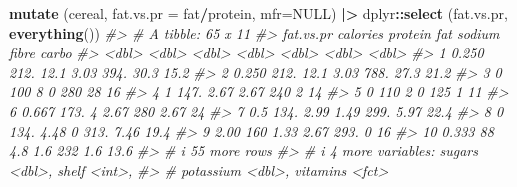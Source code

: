 \documentclass[
]{book}
\newenvironment{Shaded}{\begin{snugshade}}{\end{snugshade}}
\newcommand{\AttributeTok}[1]{\textcolor[rgb]{0.13,0.29,0.53}{#1}}
\newcommand{\CommentTok}[1]{\textcolor[rgb]{0.56,0.35,0.01}{\textit{#1}}}
\newcommand{\ConstantTok}[1]{\textcolor[rgb]{0.56,0.35,0.01}{#1}}
\newcommand{\FunctionTok}[1]{\textcolor[rgb]{0.13,0.29,0.53}{\textbf{#1}}}
\newcommand{\NormalTok}[1]{#1}
\newcommand{\SpecialCharTok}[1]{\textcolor[rgb]{0.81,0.36,0.00}{\textbf{#1}}}
\begin{document}
\begin{Shaded}
\begin{Highlighting}[]
\FunctionTok{mutate}\NormalTok{ (cereal, }\AttributeTok{fat.vs.pr =}\NormalTok{ fat}\SpecialCharTok{/}\NormalTok{protein, }\AttributeTok{mfr=}\ConstantTok{NULL}\NormalTok{) }\SpecialCharTok{|\textgreater{}}
\NormalTok{     dplyr}\SpecialCharTok{::}\FunctionTok{select}\NormalTok{ (fat.vs.pr, }\FunctionTok{everything}\NormalTok{())}
\CommentTok{\#\textgreater{} \# A tibble: 65 x 11}
\CommentTok{\#\textgreater{}    fat.vs.pr calories protein   fat sodium fibre carbo}
\CommentTok{\#\textgreater{}        \textless{}dbl\textgreater{}    \textless{}dbl\textgreater{}   \textless{}dbl\textgreater{} \textless{}dbl\textgreater{}  \textless{}dbl\textgreater{} \textless{}dbl\textgreater{} \textless{}dbl\textgreater{}}
\CommentTok{\#\textgreater{}  1     0.250     212.   12.1   3.03   394. 30.3   15.2}
\CommentTok{\#\textgreater{}  2     0.250     212.   12.1   3.03   788. 27.3   21.2}
\CommentTok{\#\textgreater{}  3     0         100     8     0      280  28     16  }
\CommentTok{\#\textgreater{}  4     1         147.    2.67  2.67   240   2     14  }
\CommentTok{\#\textgreater{}  5     0         110     2     0      125   1     11  }
\CommentTok{\#\textgreater{}  6     0.667     173.    4     2.67   280   2.67  24  }
\CommentTok{\#\textgreater{}  7     0.5       134.    2.99  1.49   299.  5.97  22.4}
\CommentTok{\#\textgreater{}  8     0         134.    4.48  0      313.  7.46  19.4}
\CommentTok{\#\textgreater{}  9     2.00      160     1.33  2.67   293.  0     16  }
\CommentTok{\#\textgreater{} 10     0.333      88     4.8   1.6    232   1.6   13.6}
\CommentTok{\#\textgreater{} \# i 55 more rows}
\CommentTok{\#\textgreater{} \# i 4 more variables: sugars \textless{}dbl\textgreater{}, shelf \textless{}int\textgreater{},}
\CommentTok{\#\textgreater{} \#   potassium \textless{}dbl\textgreater{}, vitamins \textless{}fct\textgreater{}}


\end{Highlighting}
\end{Shaded}
\end{document}
